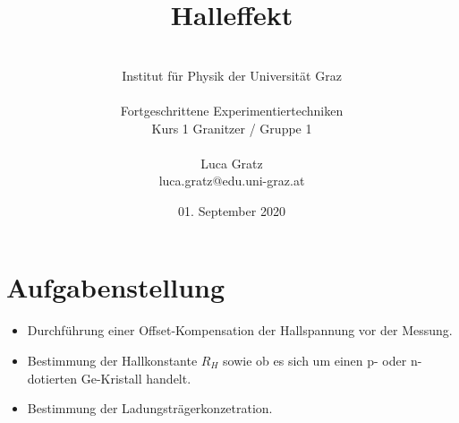\documentclass[12pt, a4paper]{article}
\begin{document}

\thispagestyle{empty}

%

\newpage
\clearpage

\newpage 
\thispagestyle{empty}
\quad 
\newpage

\thispagestyle{empty}

%

\newpage
\clearpage

\newpage 
\thispagestyle{empty}
\quad 
\newpage

\title{Halleffekt}
\author{\\
Institut für Physik der Universität Graz\\\\Fortgeschrittene Experimentiertechniken\\Kurs 1 Granitzer / Gruppe 1\\\\Luca Gratz\\ 
luca.gratz@edu.uni-graz.at\\}

\date{01. September 2020}
\maketitle
\thispagestyle{empty}

\newpage
\clearpage
\thispagestyle{empty}
\tableofcontents
\renewcommand{\contentsname}{Inhaltsverzeichnis}

\thispagestyle{empty}


\newpage

\clearpage
\setcounter{page}{1}
\section{Aufgabenstellung}
\begin{itemize}
\item Durchführung einer Offset-Kompensation der Hallspannung vor der Messung.
\item Bestimmung der Hallkonstante $R_H$ sowie ob es sich um einen p- oder n-dotierten Ge-Kristall handelt.
\item Bestimmung der Ladungsträgerkonzetration.
\end{itemize}
\end{document}
